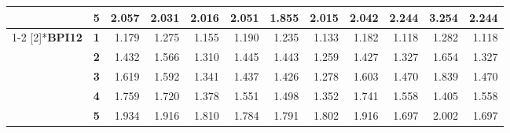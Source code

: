 \begin{table}[htbp]
\begin{tabular}{|cl|rrrrrrrrrr|}
          & \textbf{5} & \cellcolor[rgb]{ .796,  .796,  .796}2.057 & \cellcolor[rgb]{ .8,  .8,  .8}2.031 & \cellcolor[rgb]{ .8,  .8,  .8}2.016 & \cellcolor[rgb]{ .796,  .796,  .796}2.051 & \cellcolor[rgb]{ .82,  .82,  .82}1.855 & \cellcolor[rgb]{ .804,  .804,  .804}2.015 & \cellcolor[rgb]{ .8,  .8,  .8}2.042 & \cellcolor[rgb]{ .776,  .776,  .776}2.244 & \cellcolor[rgb]{ .659,  .659,  .659}3.254 & \cellcolor[rgb]{ .776,  .776,  .776}2.244 \\
\cmidrule{1-2}    \multirow{5}[2]{*}{\textbf{BPI12}} & \textbf{1} & \cellcolor[rgb]{ .839,  .839,  .839}1.179 & \cellcolor[rgb]{ .816,  .816,  .816}1.275 & \cellcolor[rgb]{ .843,  .843,  .843}1.155 & \cellcolor[rgb]{ .835,  .835,  .835}1.190 & \cellcolor[rgb]{ .827,  .827,  .827}1.235 & \cellcolor[rgb]{ .851,  .851,  .851}1.133 & \cellcolor[rgb]{ .839,  .839,  .839}1.182 & \cellcolor[rgb]{ .851,  .851,  .851}1.118 & \cellcolor[rgb]{ .816,  .816,  .816}1.282 & \cellcolor[rgb]{ .851,  .851,  .851}1.118 \\
          & \textbf{2} & \cellcolor[rgb]{ .78,  .78,  .78}1.432 & \cellcolor[rgb]{ .753,  .753,  .753}1.566 & \cellcolor[rgb]{ .808,  .808,  .808}1.310 & \cellcolor[rgb]{ .78,  .78,  .78}1.445 & \cellcolor[rgb]{ .78,  .78,  .78}1.443 & \cellcolor[rgb]{ .82,  .82,  .82}1.259 & \cellcolor[rgb]{ .784,  .784,  .784}1.427 & \cellcolor[rgb]{ .804,  .804,  .804}1.327 & \cellcolor[rgb]{ .733,  .733,  .733}1.654 & \cellcolor[rgb]{ .804,  .804,  .804}1.327 \\
          & \textbf{3} & \cellcolor[rgb]{ .741,  .741,  .741}1.619 & \cellcolor[rgb]{ .745,  .745,  .745}1.592 & \cellcolor[rgb]{ .804,  .804,  .804}1.341 & \cellcolor[rgb]{ .78,  .78,  .78}1.437 & \cellcolor[rgb]{ .784,  .784,  .784}1.426 & \cellcolor[rgb]{ .816,  .816,  .816}1.278 & \cellcolor[rgb]{ .745,  .745,  .745}1.603 & \cellcolor[rgb]{ .773,  .773,  .773}1.470 & \cellcolor[rgb]{ .69,  .69,  .69}1.839 & \cellcolor[rgb]{ .773,  .773,  .773}1.470 \\
          & \textbf{4} & \cellcolor[rgb]{ .71,  .71,  .71}1.759 & \cellcolor[rgb]{ .718,  .718,  .718}1.720 & \cellcolor[rgb]{ .792,  .792,  .792}1.378 & \cellcolor[rgb]{ .757,  .757,  .757}1.551 & \cellcolor[rgb]{ .769,  .769,  .769}1.498 & \cellcolor[rgb]{ .8,  .8,  .8}1.352 & \cellcolor[rgb]{ .714,  .714,  .714}1.741 & \cellcolor[rgb]{ .753,  .753,  .753}1.558 & \cellcolor[rgb]{ .788,  .788,  .788}1.405 & \cellcolor[rgb]{ .753,  .753,  .753}1.558 \\
          & \textbf{5} & \cellcolor[rgb]{ .667,  .667,  .667}1.934 & \cellcolor[rgb]{ .675,  .675,  .675}1.916 & \cellcolor[rgb]{ .698,  .698,  .698}1.810 & \cellcolor[rgb]{ .702,  .702,  .702}1.784 & \cellcolor[rgb]{ .702,  .702,  .702}1.791 & \cellcolor[rgb]{ .698,  .698,  .698}1.802 & \cellcolor[rgb]{ .671,  .671,  .671}1.916 & \cellcolor[rgb]{ .722,  .722,  .722}1.697 & \cellcolor[rgb]{ .651,  .651,  .651}2.002 & \cellcolor[rgb]{ .722,  .722,  .722}1.697 \\

\end{tabular}
\end{table}
